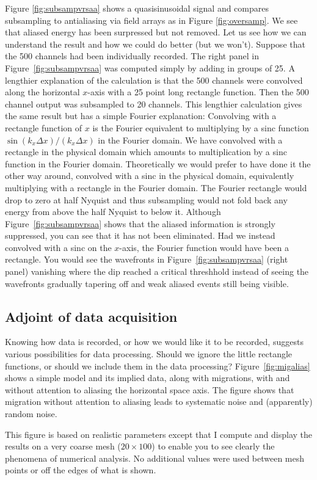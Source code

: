 \par
{}
Figure \ref{fig:subsampvrsaa} shows a quasisinusoidal signal
and compares subsampling to antialiasing
via field arrays as in
Figure \ref{fig:oversamp}.
We see that aliased energy has been surpressed but not removed.
Let us see how we can understand the result
and how we could do better (but we won't).
Suppose that the 500 channels had been individually recorded.
The right panel in
Figure~\ref{fig:subsampvrsaa}
was computed simply by adding in groups of 25.
A lengthier explanation of the calculation
is that the 500 channels were convolved along
the horizontal $x$-axis with a 25 point long rectangle function.
Then the 500 channel output was subsampled to 20 channels.
This lengthier calculation gives the same result
but has a simple Fourier explanation:
Convolving with a rectangle function of $x$
is the Fourier equivalent to multiplying by a sinc function
$\sin(k_x \Delta x) /(k_x \Delta x)$
in the Fourier domain.
We have convolved with a rectangle in the physical domain
which amounts to multiplication by a sinc function in the Fourier domain.
Theoretically we would prefer to have done it the other way around,
convolved with a sinc in the physical domain, equivalently
multiplying with a rectangle in the Fourier domain.
The Fourier rectangle would drop to zero at half Nyquist
and thus subsampling would not fold back any energy from
above the half Nyquist to below it.
Although Figure~\ref{fig:subsampvrsaa} shows that the aliased
information is strongly suppressed, you can see that it
has not been eliminated.
Had we instead convolved with a sinc on the $x$-axis,
the Fourier function would have been a rectangle.
You would see the wavefronts in
Figure~\ref{fig:subsampvrsaa} (right panel)
vanishing where the dip reached a critical threshhold
instead of seeing the wavefronts gradually tapering off
and weak aliased events still being visible.


\subsection{Adjoint of data acquisition}
Knowing how data is recorded,
or how we would like it to be recorded,
suggests various possibilities for data processing.
Should we ignore the little rectangle functions,
or should we include them in the data processing?
Figure~\ref{fig:migalias} shows a simple model and its implied data,
along with migrations,
with and without attention to aliasing the horizontal space axis.
The figure shows that migration without attention to aliasing
leads to systematic noise and (apparently) random noise.
\par
This figure is based on realistic parameters
except that I compute and display the results
on a very coarse mesh ($20\times 100$)
to enable you to see clearly the phenomena of numerical analysis.
No additional values were used between mesh points
or off the edges of what is shown.

